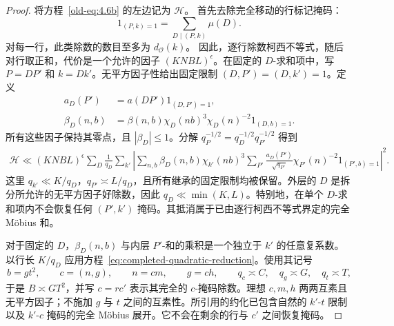 \documentclass[11pt,a4paper]{article}
\numberwithin{equation}{section}
\numberwithin{figure}{section}
\theoremstyle{definition}
\theoremstyle{remark}
\begin{document}
\begin{proof}
将方程~\eqref{old-eq:4.6b} 的左边记为 \(\mathcal H\)。
首先去除完全移动的行标记掩码：
\[
 1_{(P,k)=1}=\sum_{D\mid(P,k)}\mu(D).
\]
对每一行，此类除数的数目至多为 \(d_{\mathcal O}(k)\)。
因此，逐行除数柯西不等式，随后对行取正和，代价是一个允许的因子 \((KNBL)^\epsilon\)。在固定的 \(D\)-求和项中，写
\(P=DP'\) 和 \(k=Dk'\)。无平方因子性给出固定限制
\((D,P')=(D,k')=1\)。定义
\[
 \begin{split}
 a_D(P')&=a(DP')1_{(D,P')=1},\\
 \beta_D(n,b)&=\beta(n,b)\chi_D(nb)^3\chi_D(n)^{-2}1_{(D,b)=1}.
 \end{split}
\]
所有这些因子保持其零点，且 \(|\beta_D|\le1\)。分解
\(q_P^{-1/2}=q_D^{-1/2}q_{P'}^{-1/2}\) 得到
\begin{equation}\label{eq:hybrid-mark-mask-reduction}
 \begin{split}
 \mathcal H\ll (KNBL)^\epsilon\sum_D\frac1{q_D}
 \sum_{k'}\left|
 \sum_{n,b}\beta_D(n,b)\chi_{k'}(nb)^3
 \sum_{P'}\frac{a_D(P')}{\sqrt{q_{P'}}}
       \chi_{P'}(n)^{-2}1_{(P',b)=1}
 \right|^2.
 \end{split}
\end{equation}
这里 \(q_{k'}\ll K/q_D\)，\(q_{P'}\asymp L/q_D\)，且所有继承的固定限制均被保留。外层的 \(D\) 是拆分所允许的无平方因子好除数，因此 \(q_D\ll\min(K,L)\)。特别地，在单个 \(D\)-求和项内不会恢复任何 \((P',k')\) 掩码。其抵消属于已由逐行柯西不等式界定的完全 M\"obius 和。

对于固定的 \(D\)，\(\beta_D(n,b)\) 与内层 \(P'\)-和的乘积是一个独立于 \(k'\) 的任意复系数。以行长 \(K/q_D\) 应用方程~\eqref{eq:completed-quadratic-reduction}。使用其记号
\[
 b=gt^2,\qquad c=(n,g),\qquad n=cm,\qquad g=ch,
 \qquad q_c\asymp C,\quad q_g\asymp G,\quad q_t\asymp T,
\]
于是 \(B\asymp GT^2\)，并写 \(c=rc'\) 表示其完全的 \(c\)-掩码除数。理想 \(c,m,h\) 两两互素且无平方因子；不施加 \(g\) 与 \(t\) 之间的互素性。所引用的约化已包含自然的 \(k'\)-\(t\) 限制以及 \(k'\)-\(c\) 掩码的完全 M\"obius 展开。它不会在剩余的行与 \(c'\) 之间恢复掩码。


\end{proof}
\end{document}
